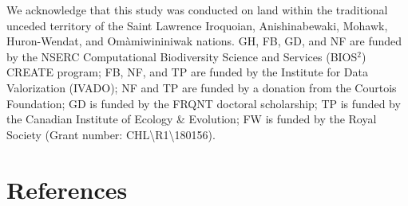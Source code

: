 \documentclass[10pt,oneside]{article}
\begin{document}
We acknowledge that this study was conducted on land within the
traditional unceded territory of the Saint Lawrence Iroquoian,
Anishinabewaki, Mohawk, Huron-Wendat, and Omàmiwininiwak nations. GH,
FB, GD, and NF are funded by the NSERC Computational Biodiversity
Science and Services (BIOS\(^2\)) CREATE program; FB, NF, and TP are
funded by the Institute for Data Valorization (IVADO); NF and TP are
funded by a donation from the Courtois Foundation; GD is funded by the
FRQNT doctoral scholarship; TP is funded by the Canadian Institute of
Ecology \& Evolution; FW is funded by the Royal Society (Grant number:
CHL\textbackslash R1\textbackslash180156).

\hypertarget{references}{%
\section*{References}\label{references}}
\end{document}
